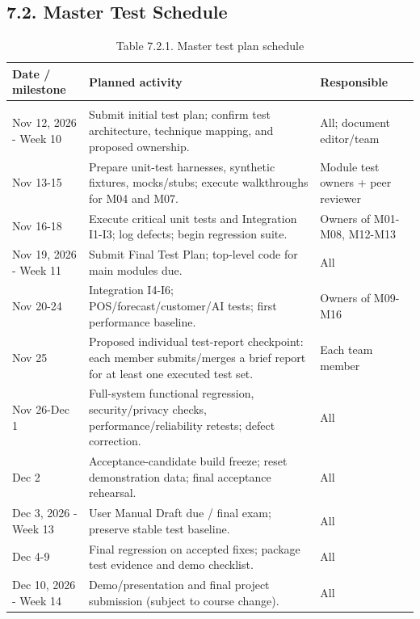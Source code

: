 \subsection{7.2. Master Test Schedule}\label{master-test-schedule}

{\def\LTcaptype{none} %
\begin{longtable}[]{|
  >{\raggedright\arraybackslash}m{}|
  >{\raggedright\arraybackslash}m{}|
  >{\raggedright\arraybackslash}m{}|}
\hline
\begin{minipage}[c]{\linewidth}\raggedright
\textbf{Date / milestone}
\end{minipage} & \begin{minipage}[c]{\linewidth}\raggedright
\textbf{Planned activity}
\end{minipage} & \begin{minipage}[c]{\linewidth}\raggedright
\textbf{Responsible}
\end{minipage} \\
\hline
\endhead

\caption*{Table 7.2.1. Master test plan schedule}\\
\endlastfoot
Nov 12, 2026 - Week 10 & Submit initial test plan; confirm test architecture, technique mapping, and proposed ownership. & All; document editor/team \\ \hline
Nov 13-15 & Prepare unit-test harnesses, synthetic fixtures, mocks/stubs; execute walkthroughs for M04 and M07. & Module test owners + peer reviewer \\ \hline
Nov 16-18 & Execute critical unit tests and Integration I1-I3; log defects; begin regression suite. & Owners of M01-M08, M12-M13 \\ \hline
Nov 19, 2026 - Week 11 & Submit Final Test Plan; top-level code for main modules due. & All \\ \hline
Nov 20-24 & Integration I4-I6; POS/forecast/customer/AI tests; first performance baseline. & Owners of M09-M16 \\ \hline
Nov 25 & Proposed individual test-report checkpoint: each member submits/merges a brief report for at least one executed test set. & Each team member \\ \hline
Nov 26-Dec 1 & Full-system functional regression, security/privacy checks, performance/reliability retests; defect correction. & All \\ \hline
Dec 2 & Acceptance-candidate build freeze; reset demonstration data; final acceptance rehearsal. & All \\ \hline
Dec 3, 2026 - Week 13 & User Manual Draft due / final exam; preserve stable test baseline. & All \\ \hline
Dec 4-9 & Final regression on accepted fixes; package test evidence and demo checklist. & All \\ \hline
Dec 10, 2026 - Week 14 & Demo/presentation and final project submission (subject to course change). & All \\ \hline
\end{longtable}
}

